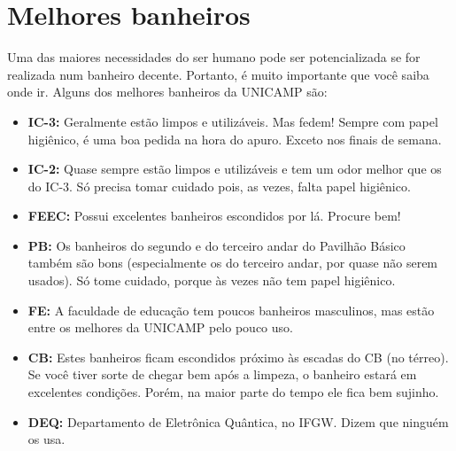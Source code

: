 \documentclass[a4paper,10pt, twocolumn]{article}
\begin{document}
\section{Melhores banheiros}
Uma das maiores necessidades do ser humano pode ser potencializada se for
realizada num banheiro decente. Portanto, é muito importante que você saiba onde
ir. Alguns dos melhores banheiros da UNICAMP são:

\begin{itemize}
\item  \textbf{IC-3:} Geralmente estão limpos e utilizáveis. Mas fedem! Sempre com papel higiênico, é uma boa pedida na hora do apuro. Exceto nos finais de semana.
\end{itemize}

\begin{itemize}
\item  \textbf{IC-2:} Quase sempre estão limpos e utilizáveis e tem um odor melhor que os do IC-3. Só precisa tomar cuidado pois, as vezes, falta papel higiênico.
\end{itemize}

\begin{itemize}
\item  \textbf{FEEC:} Possui excelentes banheiros escondidos por lá. Procure bem!
\end{itemize}

\begin{itemize}
\item  \textbf{PB:} Os banheiros do segundo e do terceiro andar do Pavilhão Básico também são bons (especialmente os do terceiro andar, por quase não serem usados). Só tome cuidado, porque às vezes não tem papel higiênico.
\end{itemize}

\begin{itemize}
\item  \textbf{FE:} A faculdade de educação tem poucos banheiros masculinos, mas estão entre os melhores da UNICAMP pelo pouco uso.
\end{itemize}

\begin{itemize}
\item  \textbf{CB:} Estes banheiros ficam escondidos próximo às escadas do CB (no térreo). Se você tiver sorte de chegar bem após a limpeza, o banheiro estará em excelentes condições. Porém, na maior parte do tempo ele fica bem sujinho.
\end{itemize}

\begin{itemize}
\item  \textbf{DEQ:} Departamento de Eletrônica Quântica, no IFGW. Dizem que ninguém os usa.
\end{itemize}
\end{document}
